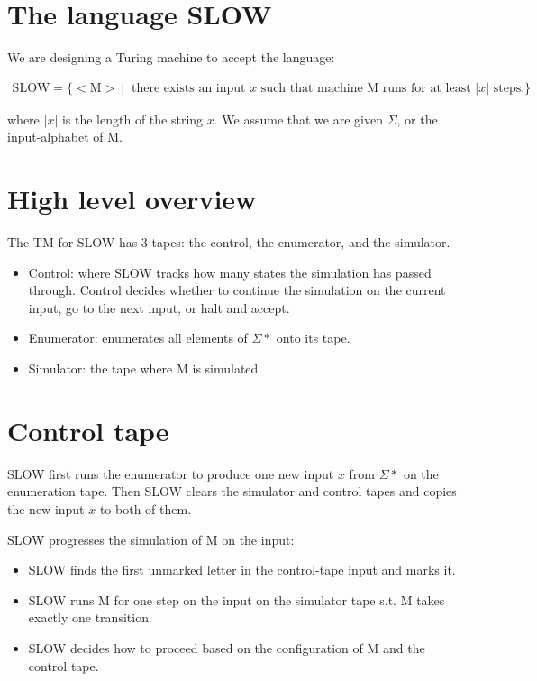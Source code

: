 \documentclass[11pt,addpoints,answers]{exam}
\newcommand{\1}{\mathbf{1}}
\begin{document}
\pagestyle{head}                %

\medskip
 
\section{The language SLOW}

\noindent We are designing a Turing machine to accept the language:

\begin{align*}
    \text{SLOW} = \{<\text{M}>\ |\  \text{ there exists an input } x \text{ such that machine M runs for at least } |x| \text{ steps.}\}
\end{align*}

\noindent where $|x|$ is the length of the string $x$. We assume that we are given $\Sigma$, or the input-alphabet of M.

\section{High level overview}

The TM for SLOW has 3 tapes: the control, the enumerator, and the simulator.

\begin{itemize}
    \item Control: where SLOW tracks how many states the simulation has passed through. Control decides whether to continue the simulation on the current input, go to the next input, or halt and accept.
    \item Enumerator: enumerates all elements of $\Sigma *$ onto its tape.
    \item Simulator: the tape where M is simulated
\end{itemize}

\section{Control tape}
SLOW first runs the enumerator to produce one new input $x$ from $\Sigma *$ on the enumeration tape. Then SLOW clears the simulator and control tapes and copies the new input $x$ to both of them.

\medskip

\noindent SLOW progresses the simulation of M on the input:

\begin{itemize}
    \item SLOW finds the first unmarked letter in the control-tape input and marks it. 
    \item SLOW runs M for one step on the input on the simulator tape s.t. M takes exactly one transition.
    \item SLOW decides how to proceed based on the configuration of M and the control tape.
\end{itemize}
\end{document}
